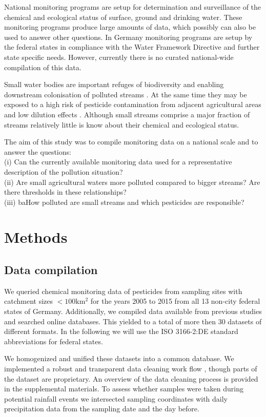 \documentclass[journal=esthag,manuscript=article]{achemso}
\begin{document}
National monitoring programs are setup for determination and surveillance of the chemical and ecological status of surface, ground and drinking water.
These monitoring programs produce large amounts of data, which possibly can also be used to answer other questions.
In Germany monitoring programs are setup by the federal states in compliance with the Water Framework Directive \citep{quevauviller_water_2008} and further state specific needs.
However, currently there is no curated national-wide compilation of this data.

Small water bodies are important refuges of biodiversity \citep{davies_comparison_2008} and enabling downstream colonisation of polluted streams \citep{liess_analyzing_2005}.
At the same time they may be exposed to a high risk of pesticide contamination from adjacent agricultural areas and low dilution effects \citep{liess_determination_1999}.
Although small streams comprise a major fraction of streams \citep{nadeau_hydrological_2007} relatively little is know about their chemical and ecological status.

The aim of this study was to compile monitoring data on a national scale and to answer the questions: \\
(i) Can the currently available monitoring data used for a representative description of the pollution situation? \\
(ii) Are small agricultural waters more polluted compared to bigger streams? Are there thresholds in these relationships? \\
(iii) baHow polluted are small streams and which pesticides are responsible?


\section{Methods}
\subsection{Data compilation}

We queried chemical monitoring data of pesticides from sampling sites with catchment sizes $\mathrm{< 100km^2}$ for the years 2005 to 2015 from all 13 non-city federal states of Germany.
Additionally, we compiled data available from previous studies and searched online databases.
This yielded to a total of more then 30 datasets of different formats.
In the following we will use the ISO 3166-2:DE standard abbreviations for federal states.

We homogenized and unified these datasets into a common database.
We implemented a robust and transparent data cleaning work flow \citep{poisot_best_2015}, though parts of the dataset are proprietary.
An overview of the data cleaning process is provided in the supplemental materials.  
To assess whether samples were taken during potential rainfall events we intersected sampling coordinates with daily precipitation data \citep{rauthe_central_2013} from the sampling date and the day before.
\end{document}
